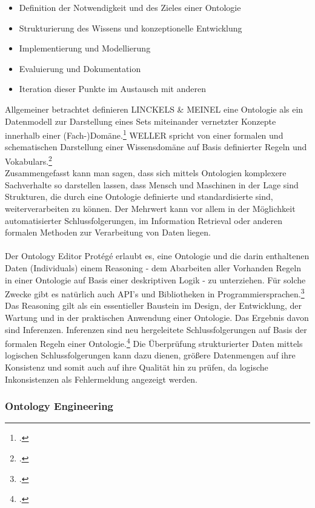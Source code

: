 \documentclass[12pt,a4paper]{article}
\begin{document}
\begin{itemize}
\item Definition der Notwendigkeit und des Zieles einer Ontologie
\item Strukturierung des Wissens und konzeptionelle Entwicklung
\item Implementierung und Modellierung
\item Evaluierung und Dokumentation
\item Iteration dieser Punkte im Austausch mit anderen
\end{itemize}
Allgemeiner betrachtet definieren LINCKELS \& MEINEL eine Ontologie als ein Datenmodell zur Darstellung eines Sets miteinander vernetzter Konzepte innerhalb einer (Fach-)Domäne.\footcite{linckels2011librarian}
WELLER spricht von einer formalen und schematischen Darstellung einer Wissensdomäne auf Basis definierter Regeln und Vokabulars.\footcite{weller2013InformationBand}
\\ 
Zusammengefasst kann man sagen, dass sich mittels Ontologien komplexere Sachverhalte so darstellen lassen, dass Mensch und Maschinen in der Lage sind Strukturen, die durch eine Ontologie definierte und standardisierte sind, weiterverarbeiten zu können. Der Mehrwert kann vor allem in der Möglichkeit automatisierter Schlussfolgerungen, im Information Retrieval oder anderen formalen Methoden zur Verarbeitung von Daten liegen.
\\
\\
Der Ontology Editor Protégé erlaubt es, eine Ontologie und die darin enthaltenen Daten (Individuals) einem Reasoning - dem Abarbeiten aller Vorhanden Regeln in einer Ontologie auf Basis einer deskriptiven Logik - zu unterziehen. Für solche Zwecke gibt es natürlich auch API's und Bibliotheken in Programmiersprachen.\footcite{musen2015protege} Das Reasoning gilt als ein essentieller Baustein im Design, der Entwicklung, der Wartung und in der praktischen Anwendung einer Ontologie. Das Ergebnis davon sind Inferenzen. Inferenzen sind neu hergeleitete Schlussfolgerungen auf Basis der formalen Regeln einer Ontologie.\footcite{dentler2011comparison} Die Überprüfung strukturierter Daten mittels logischen Schlussfolgerungen kann dazu dienen, größere Datenmengen auf ihre Konsistenz und somit auch auf ihre Qualität hin zu prüfen, da logische Inkonsistenzen als Fehlermeldung angezeigt werden.

\subsubsection{Ontology Engineering}
\end{document}
